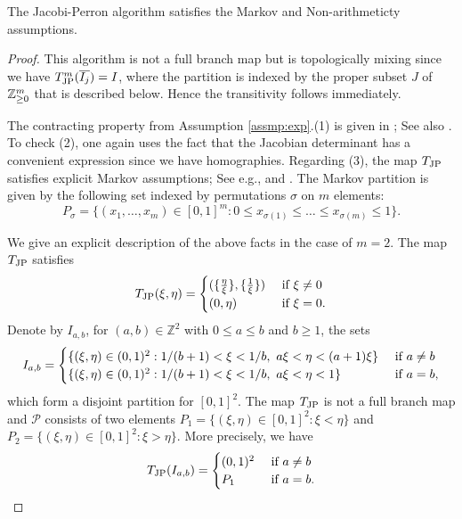 \documentclass[12pt,a4paper,reqno]{amsart}
\begin{document}
\begin{proposition}
The Jacobi-Perron algorithm satisfies the Markov and Non-arithmeticty assumptions.
\end{proposition}
\begin{proof}
This algorithm is not a full branch map but is topologically mixing since we have $T_{\rm JP}^m(\overline{I_j})=I$, where the partition is indexed by the proper subset $J$ of ${\mathbb Z}_{\geq 0}^m$ that is described below. Hence the transitivity follows immediately.

The contracting property from Assumption \ref{assmp:exp}.(1) is given in  \cite{broise}; See also  \cite{BAG:01}.  
To check (2), one  again uses the fact that the Jacobian determinant has  a convenient  expression since  we have homographies.
Regarding (3), the map $T_{\rm JP}$ satisfies explicit   Markov  assumptions; See e.g., \cite[Proposition 8]{Schweiger:00}
and \cite[Prop. 2.12]{broise}. The Markov  partition is  given by the  following set  indexed by permutations $\sigma$ on  $m$ elements:
$$P_{\sigma}=\{  (x_1, \ldots, x_m)\in [0,1]^m :0 \leq x_{\sigma(1)} \leq \ldots \leq x_{\sigma(m)} \leq 1 \}.$$ 

We give an explicit description of the above facts in the case of $m=2$.
The map  $T_{\rm JP}$  satisfies $$
T_{\rm JP}(\xi,\eta) =
\begin{cases}
(\{\frac{\eta}{\xi} \},\{ \frac{1}{\xi} \})& \hbox{ if } \xi \neq 0\\
(0, \eta) &  \hbox{ if } \xi=0 .
\end{cases}
$$
Denote by $I_{a,b}$, for $(a, b) \in \mathbb{Z}^2$ with $0 \leq a \leq b$ and $b \geq 1$, the sets 
\[ I_{a,b}=
\begin{cases}
\{ (\xi, \eta) \in (0,1)^2: 1/(b+1) < \xi < 1/b , \  a \xi < \eta < (a+1)\xi  \} &  \hbox{ if } a \neq b \\
\{ (\xi, \eta) \in (0,1)^2: 1/(b+1) < \xi < 1/b , \  a \xi < \eta < 1  \}  &  \hbox{ if } a = b,
\end{cases}
\]
 which form a disjoint partition for $[0,1]^2$. The map $T_{\rm JP}$ is not a full branch map and $\mathcal P$ consists of two elements   $P_1= \{(\xi,\eta ) \in [0,1]^2: \xi<\eta\}$ and $P_2= \{(\xi,\eta ) \in [0,1]^2: \xi > \eta\}$. More precisely, we have 
$$
T_{\rm JP}(I_{a,b}) =
\begin{cases}
(0,1)^2 & \hbox{ if } a \neq b\\
P_1 &  \hbox{ if } a=b.
\end{cases}
$$


\end{proof}
\end{document}
